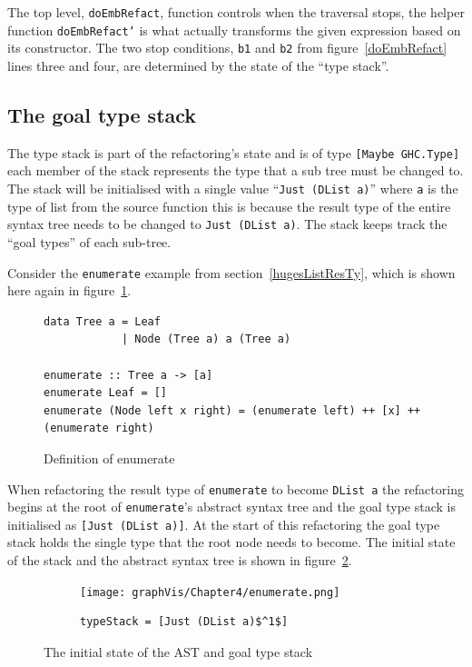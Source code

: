The top level, \texttt{doEmbRefact}, function controls when the traversal stops, the helper function \texttt{doEmbRefact'} is what actually transforms the given expression based on its constructor. The two stop conditions, \texttt{b1} and \texttt{b2} from figure~\ref{doEmbRefact} lines three and four, are determined by the state of the ``type stack''.

\subsection{The goal type stack}
\label{typeStack}

The type stack is part of the refactoring's state and is of type \texttt{[Maybe GHC.Type]} each member of the stack represents the type that a sub tree must be changed to. The stack will be initialised with a single value ``\texttt{Just (DList a)}'' where \texttt{a} is the type of list from the source function this is because the result type of the entire syntax tree needs to be changed to \texttt{Just (DList a)}. The stack keeps track the ``goal types'' of each sub-tree. 

Consider the \texttt{enumerate} example from section~\ref{hugesListResTy}, which is shown here again in figure~\ref{enumerate2}.

\begin{figure}[t]
\begin{lstlisting}
data Tree a = Leaf
            | Node (Tree a) a (Tree a)

enumerate :: Tree a -> [a]
enumerate Leaf = []
enumerate (Node left x right) = (enumerate left) ++ [x] ++ (enumerate right)

\end{lstlisting}
\caption{Definition of enumerate}
\label{enumerate2}
\end{figure}

When refactoring the result type of \texttt{enumerate} to become \texttt{DList a} the refactoring begins at the root of \texttt{enumerate}'s abstract syntax tree and the goal type stack is initialised as \texttt{[Just (DList a)]}. At the start of this refactoring the goal type stack holds the single type that the root node needs to become. The initial state of the stack and the abstract syntax tree is shown in figure~\ref{initASTStack}.

\begin{figure}[t]
	\begin{subfigure}{\linewidth}
		\texttt{[image: graphVis/Chapter4/enumerate.png]}
	\end{subfigure}\par\medskip

	\begin{subfigure}{\linewidth}
		\begin{lstlisting}[mathescape]
			typeStack = [Just (DList a)$^1$]
		\end{lstlisting}
	\end{subfigure}\par\medskip
\caption{The initial state of the AST and goal type stack}
\label{initASTStack}
\end{figure} 

